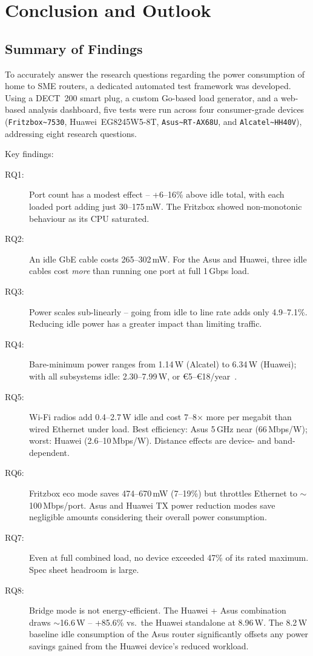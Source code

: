 \section{Conclusion and Outlook}
\label{sec:conclusion}

\subsection{Summary of Findings}

To accurately answer the research questions regarding the power consumption of home to \ac{SME} routers, a dedicated automated test framework was developed.
Using a \ac{DECT}~200 smart plug, a custom Go-based load generator, and a web-based analysis dashboard, five tests were run across four consumer-grade devices (\verb|Fritzbox~7530|, Huawei~EG8245W5-8T, \verb|Asus~RT-AX68U|, and \verb|Alcatel~HH40V|), addressing eight research questions.

Key findings:
\begin{description}
    \item[RQ1:] Port count has a modest effect -- +6--16\% above idle total, with each loaded port adding just 30--175\,mW. The Fritzbox showed non-monotonic behaviour as its \ac{CPU} saturated.
    \item[RQ2:] An idle \ac{GbE} cable costs 265--302\,mW. For the Asus and Huawei, three idle cables cost \emph{more} than running one port at full 1\,Gbps load.
    \item[RQ3:] Power scales sub-linearly -- going from idle to line rate adds only 4.9--7.1\%. Reducing idle power has a greater impact than limiting traffic.
    \item[RQ4:] Bare-minimum power ranges from 1.14\,W (Alcatel) to 6.34\,W (Huawei); with all subsystems idle: 2.30--7.99\,W, or \euro{5}--\euro{18}/year~\cite{bib:eurostat-electricity}.
    \item[RQ5:] Wi-Fi radios add 0.4--2.7\,W idle and cost 7--8$\times$ more per megabit than wired Ethernet under load. Best efficiency: Asus 5\,GHz near (66\,Mbps/W); worst: Huawei (2.6--10\,Mbps/W). Distance effects are device- and band-dependent.
    \item[RQ6:] Fritzbox eco mode saves 474--670\,mW (7--19\%) but throttles Ethernet to $\sim$100\,Mbps/port. Asus and Huawei TX power reduction modes save negligible amounts considering their overall power consumption.
    \item[RQ7:] Even at full combined load, no device exceeded 47\% of its rated maximum. Spec sheet headroom is large.
    \item[RQ8:] Bridge mode is not energy-efficient. The Huawei + Asus combination draws $\sim$16.6\,W -- +85.6\% vs.\ the Huawei standalone at 8.96\,W. The 8.2\,W baseline idle consumption of the Asus router significantly offsets any power savings gained from the Huawei device's reduced workload.
\end{description}

